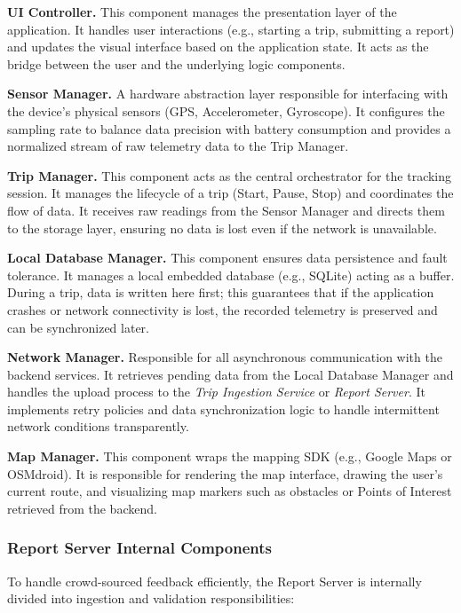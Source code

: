\textbf{UI Controller.}
This component manages the presentation layer of the application. It handles user interactions (e.g., starting a trip, submitting a report) and updates the visual interface based on the application state. It acts as the bridge between the user and the underlying logic components.

\textbf{Sensor Manager.}
A hardware abstraction layer responsible for interfacing with the device's physical sensors (GPS, Accelerometer, Gyroscope). It configures the sampling rate to balance data precision with battery consumption and provides a normalized stream of raw telemetry data to the Trip Manager.

\textbf{Trip Manager.}
This component acts as the central orchestrator for the tracking session. It manages the lifecycle of a trip (Start, Pause, Stop) and coordinates the flow of data. It receives raw readings from the Sensor Manager and directs them to the storage layer, ensuring no data is lost even if the network is unavailable.

\textbf{Local Database Manager.}
This component ensures data persistence and fault tolerance. It manages a local embedded database (e.g., SQLite) acting as a buffer. During a trip, data is written here first; this guarantees that if the application crashes or network connectivity is lost, the recorded telemetry is preserved and can be synchronized later.

\textbf{Network Manager.}
Responsible for all asynchronous communication with the backend services. It retrieves pending data from the Local Database Manager and handles the upload process to the \textit{Trip Ingestion Service} or \textit{Report Server}. It implements retry policies and data synchronization logic to handle intermittent network conditions transparently.

\textbf{Map Manager.}
This component wraps the mapping SDK (e.g., Google Maps or OSMdroid). It is responsible for rendering the map interface, drawing the user's current route, and visualizing map markers such as obstacles or Points of Interest retrieved from the backend.

\subsubsection{Report Server Internal Components}

To handle crowd-sourced feedback efficiently, the Report Server is internally divided into ingestion and validation responsibilities:

